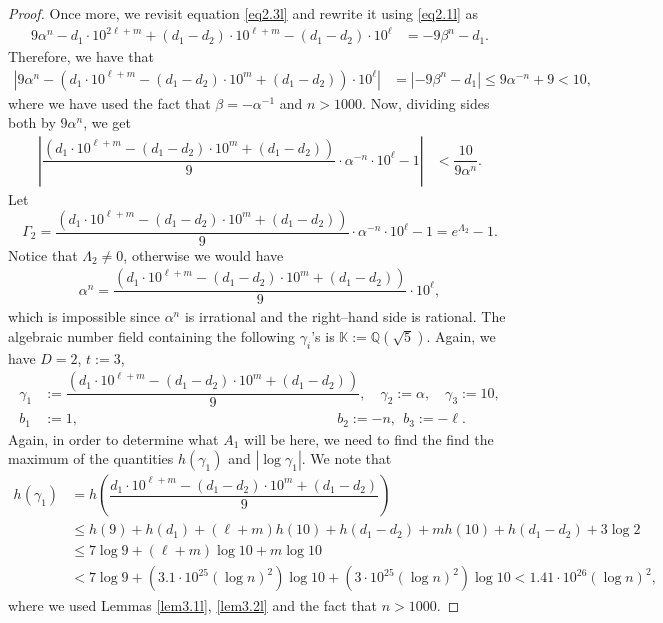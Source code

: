\begin{proof}
	Once more, we revisit equation \eqref{eq2.3l} and rewrite it using \eqref{eq2.1l} as	
	\begin{align*}
		9\alpha^n-d_1\cdot 10^{2\ell+m} +(d_1-d_2)\cdot 10^{\ell+m}-(d_1-d_2)\cdot 10^{\ell}&=-9\beta^n -d_1.
	\end{align*}	
	Therefore, we have that
	\begin{align*}
		\left|9\alpha^n-(d_1\cdot 10^{\ell+m}-(d_1-d_2)\cdot 10^{m}+(d_1-d_2))\cdot 10^{\ell}\right| &=\left|-9\beta^n -d_1\right|\le 9\alpha^{-n}+9<10,
	\end{align*}	
	where we have used the fact that $\beta=-\alpha^{-1}$ and $n>1000$. Now, dividing sides both by $9\alpha^n$, we get	
	\begin{align}\label{eq3.5l}
		\left|\dfrac{(d_1\cdot 10^{\ell+m}-(d_1-d_2)\cdot 10^{m}+(d_1-d_2))}{9}\cdot \alpha^{-n}\cdot 10^{\ell}-1\right|
		&<\dfrac{10}{9\alpha^{n}}.
	\end{align}	
	Let 
	$$
	\Gamma_2=\dfrac{(d_1\cdot 10^{\ell+m}-(d_1-d_2)\cdot 10^{m}+(d_1-d_2))}{9}\cdot \alpha^{-n}\cdot 10^{\ell}-1=e^{\Lambda_2}-1.
	$$
	Notice that $\Lambda_2\ne 0$, otherwise we would have
	\begin{align*}
		\alpha^n=\dfrac{(d_1\cdot 10^{\ell+m}-(d_1-d_2)\cdot 10^{m}+(d_1-d_2))}{9}\cdot 10^{\ell},
	\end{align*}
	which is impossible since $	\alpha^n$ is irrational and the right--hand side is rational. The algebraic number field containing the following $\gamma_i$'s is $\mathbb{K} := \mathbb{Q}(\sqrt{5})$. Again, we have $D = 2$, $t :=3$,
	\begin{equation}\nonumber
		\begin{aligned}
			\gamma_{1}&:=\dfrac{(d_1\cdot 10^{\ell+m}-(d_1-d_2)\cdot 10^{m}+(d_1-d_2))}{9},\quad\gamma_{2}:=\alpha,\quad\gamma_{3}:=10,\\
			b_{1}&:=1,\quad \quad\quad\quad\quad\quad \quad\quad\quad\quad\quad \quad\quad\quad\quad\quad\quad\quad~~ b_{2}:=-n,~~ b_{3}:=-\ell.
		\end{aligned}
	\end{equation}
Again, in order to determine what $A_1$ will be here, we need to find the find the maximum of the quantities $h(\gamma_{1} )$ and $|\log \gamma_1 |$. We note that
	\begin{align*}
		h(\gamma_{1})&=h\left(\dfrac{d_1\cdot 10^{\ell+m}-(d_1-d_2)\cdot 10^{m}+(d_1-d_2)}{9}\right) \\
		&\le h(9)+h(d_1)+(\ell+m) h(10)+h(d_1-d_2)+mh(10)+h(d_1-d_2)+3\log 2 \\
		&\le 7\log 9+(\ell+m) \log 10+m \log 10\\
		&<7\log 9+\left(3.1\cdot 10^{25}(\log n)^2\right)\log 10+\left(3\cdot 10^{25}(\log n)^2\right)\log 10
		<1.41\cdot 10^{26}(\log n)^2,
	\end{align*}
	where we used Lemmas \ref{lem3.1l}, \ref{lem3.2l} and the fact that $n>1000$. 
	

\end{proof}
